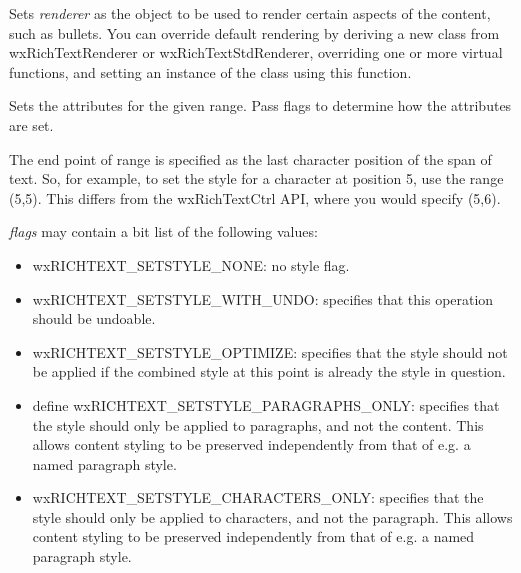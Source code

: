 Sets {\it renderer} as the object to be used to render certain aspects of the content, such as bullets.
You can override default rendering by deriving a new class from wxRichTextRenderer or wxRichTextStdRenderer,
overriding one or more virtual functions, and setting an instance of the class using this function.

\label{wxrichtextbuffersetstyle}



Sets the attributes for the given range. Pass flags to determine how the attributes are set.

The end point of range is specified as the last character position of the span of text.
So, for example, to set the style for a character at position 5, use the range (5,5).
This differs from the wxRichTextCtrl API, where you would specify (5,6).

{\it flags} may contain a bit list of the following values:

\begin{itemize}\itemsep=0pt
\item wxRICHTEXT\_SETSTYLE\_NONE: no style flag.
\item wxRICHTEXT\_SETSTYLE\_WITH\_UNDO: specifies that this operation should be undoable.
\item wxRICHTEXT\_SETSTYLE\_OPTIMIZE: specifies that the style should not be applied if the
combined style at this point is already the style in question.
\item define wxRICHTEXT\_SETSTYLE\_PARAGRAPHS\_ONLY: specifies that the style should only be applied to paragraphs,
and not the content. This allows content styling to be preserved independently from that of e.g. a named paragraph style.
\item wxRICHTEXT\_SETSTYLE\_CHARACTERS\_ONLY: specifies that the style should only be applied to characters,
and not the paragraph. This allows content styling to be preserved independently from that of e.g. a named paragraph style.
\end{itemize}

\label{wxrichtextbuffersetstylesheet}

